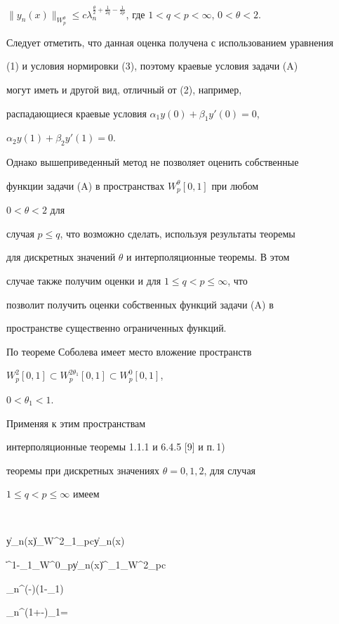 $\|y_n(x)\|_{W^\theta_p}\le c \lambda_n^{\frac{\theta}{2}+ 


\frac{1}{2q}-\frac{1}{2p}}$, где $1<q<p<\infty$, $0<\theta<2$. 


 


Следует отметить, что данная оценка получена с использованием уравнения 


(1) и условия нормировки (3), поэтому краевые условия задачи (A) 


могут иметь и другой вид, отличный от (2), например, 


распадающиеся краевые условия $\alpha_1y(0)+\beta_1y'(0)=0$, 


$\alpha_2y(1)+\beta_2y'(1)=0$. 


Однако вышеприведенный метод не позволяет оценить собственные 


функции задачи (A) в пространствах $W^\theta_p[0,1]$ при любом 


$0<\theta<2$ для 


случая $p\le q$, что возможно сделать, используя результаты теоремы 


для дискретных значений $\theta$ и интерполяционные теоремы. В этом 


случае также получим оценки и для $1\le q<p\le\infty$, что 


позволит получить оценки собственных функций задачи (A) в 


пространстве существенно ограниченных функций. 


 


По теореме Соболева имеет место вложение пространств 


$W^2_p[0,1]\subset W^{2\theta_1}_p[0,1]\subset W^0_p[0,1]$, 


$0<\theta_1<1$. 


Применяя к этим пространствам 


интерполяционные теоремы 1.1.1 и 6.4.5 [9] и п.\,1) 


теоремы при дискретных значениях $\theta=0,1,2$, для случая 


$1\le q<p\le\infty$ имеем 


$$ 


\|y_n(x)\|_{W^{2\theta_1}_p}\le c\|y_n(x) 


\|^{1-\theta_1}_{W^0_p}\|y_n(x)\|^{\theta_1}_{W^2_p}\le c 


\lambda_n^{(-)(1-\theta_1)} 


\lambda_n^{(1+-)\theta_1}= 


